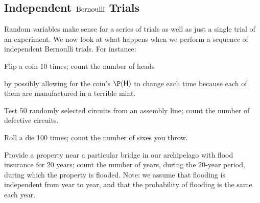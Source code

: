 \subsection{Independent $\mbox{{\rm Bernoulli}}$ Trials}

Random variables make sense for a series of trials as well as just a single trial of an experiment.  
We now look at  what happens when we perform a sequence of independent Bernoulli trials.  
For instance:
\bit
\item Flip a coin 10 times; count the  number of heads 
\bit
\item by possibly allowing for the coin's $\P(\mathsf{H})$ to change each time because each of them are manufactured in a terrible mint.
\eit
\item Test 50 randomly selected circuits from an assembly line; count
  the  number of defective circuits.
\item  Roll a die 100 times; count the  number of sixes you throw.
\item Provide a property near a particular bridge in our archipelago with flood insurance
  for 20 years; count the number of years, during the 20-year period,
  during which the property is flooded. Note: we assume that flooding is
  independent from year to year, and that the probability of flooding is the same
  each year.
\eit

